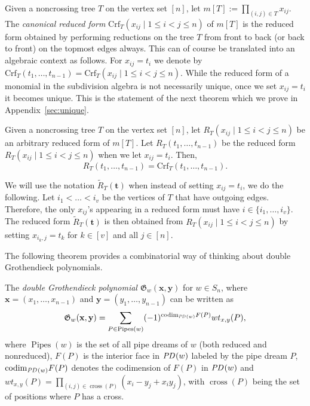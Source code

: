 \documentclass[ALCO,ThmDefs]{cedram}
\numberwithin{equation}{section}
\DeclareMathOperator{\Pipes}{Pipes}
\DeclareMathOperator{\cross}{cross}
\newcommand*{\Crf}{\mathrm{Crf}}
\newcommand*\+{\smash{\lower2pt\hbox{\rlap{\vrule height14pt}}\raise2pt\hbox{\rlap{\hskip-3pt \vrule height.4pt depth0pt width14.7pt}}}}
\newcommand*{\MK}{\mkern 2mu}
\DeclareMathOperator{\PD}{\textit{PD}\MK}
\begin{document}
Given a noncrossing tree $T$ on the vertex set $[n]$, let $m[T]:=\prod_{(i,j)\in T} x_{ij}$. The \emph{canonical reduced form} $\Crf_T(x_{ij} \mid 1\leq i<j\leq n)$ of $m[T]$ is the reduced form obtained by performing reductions on the tree $T$ from front to back (or back to front) on the topmost edges always. This can of course be translated into an algebraic context as follows. For $x_{ij}=t_i$ we denote by $\Crf_T(t_{1}, \dots, t_{n-1})=\Crf_T(x_{ij} \mid 1\leq i<j\leq n)$. While the reduced form of a monomial in the subdivision algebra is not necessarily unique, once we set $x_{ij}=t_i$ it becomes unique. This is the statement of the next theorem which we prove in Appendix~\ref{sec:unique}.

\begin{theo}\label{thm:unique}
Given a noncrossing tree $T$ on the vertex set $[n]$, let $R_T(x_{ij} \mid 1\leq i<j\leq n)$ be an arbitrary reduced form of $m[T]$. Let $R_T(t_{1}, \dots, t_{n-1})$ be the reduced form $R_T(x_{ij} \mid 1\leq i<j\leq n)$ when we let $x_{ij}=t_i$. Then,
\begin{equation}
R_T(t_{1}, \dots, t_{n-1})=\Crf_T(t_{1}, \dots, t_{n-1}).
\end{equation}
\end{theo}

We will use the notation $\tilde{R}_T(\mathbf{t})$ when instead of setting $x_{ij}=t_i$, we do the following. Let $i_1< \dots< i_v$ be the vertices of $T$ that have outgoing edges. Therefore, the only $x_{ij}$'s appearing in a reduced form must have $i \in \{i_1, \dots, i_v\}$. The reduced form $\tilde{R}_T(\mathbf{t})$ is then obtained from $R_T(x_{ij} \mid 1\leq i<j\leq n)$ by setting $x_{i_k, j}=t_k$ for $k \in [v]$ and all $j\in [n]$.


The following theorem provides a combinatorial way of thinking about double Grothendieck polynomials.

\begin{theo}\label{allen}
The \emph{double Grothendieck polynomial $\mathfrak{G}_w(\mathbf{x, y})$} for $w \in S_n$, where $\mathbf{x}=(x_1, \dots, x_{n-1})$ and $\mathbf{y}=(y_1, \dots, y_{n-1})$ can be written as
\begin{equation}
\mathfrak{G}_w(\mathbf{x, y})=\sum_{P\in \Pipes(w)}(-1)^{\mathrm{codim}_{\PD(w)}F(P)} wt_{x,y}(P),\label{eq:groth}
\end{equation}
where $\Pipes(w)$ is the set of all pipe dreams of $w$ (both reduced and nonreduced), $F(P)$ is the interior face in $\PD(w)$ labeled by the pipe dream $P$, $\mathrm{codim}_{\PD(w)} F(P)$ denotes the codimension of $F(P)$ in $\PD(w)$ and $wt_{x,y}(P)=\prod_{(i,j) \in \cross(P)} (x_i-y_j+x_iy_j)$, with $\cross(P)$ being the set of positions where $P$ has a cross. 
\end{theo}
\end{document}
